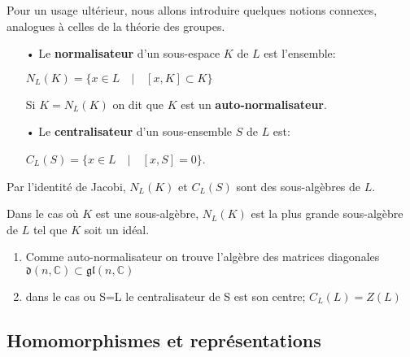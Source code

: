\documentclass[a4paper,openany,12pt]{report}
\newcommand{\CC}{\mathbb{C}}
\newcommand{\gl}{\mathfrak{gl}}
\newcommand{\dd}{\mathfrak{d}}
\theoremstyle{break}
{\theorembodyfont{\upshape}
\newtheorem*{rmq}{Remarque :}
\newtheorem*{prv}{Preuve :}
\newtheorem*{ex}{Exemples :}
\newtheorem*{exe}{Exemple : }
\newtheorem*{nota}{Notation :}
\newtheorem*{dem}{D\'emonstration :}}
\begin{document}
Pour un usage ultérieur, nous allons introduire quelques notions connexes, analogues à celles de la théorie des groupes.

\begin{df}
\begin{itemize}

\item[•] Le \textbf{normalisateur} d'un sous-espace $K$ de $L$ est l'ensemble:  
 \begin{center}
$ N_{L}(K)=\{x \in L \quad |\quad [x,K] \subset K \} $ 
 \end{center}
Si $K = N_{L}(K)$ on dit que $K$ est un \textbf{auto-normalisateur}.

\item[•] Le \textbf{centralisateur} d'un sous-ensemble $S$ de $L$ est:
\begin{center}
$C_{L}(S) = \{x \in L\quad  | \quad [x,S]=0\}$.

\end{center} 
\end{itemize}
\end{df}

\begin{rmq} 
\quad Par l’identité de Jacobi, $N_L(K)$ et $C_L(S)$ sont des sous-algèbres de $L$.

Dans le cas où $K$ est une sous-algèbre, $N_{L}(K)$ est la plus grande sous-algèbre de $L$ tel que $K$ soit un idéal.
\end{rmq}

\begin{exe}
\begin{enumerate}
\item Comme auto-normalisateur on trouve l'algèbre des matrices diagonales\\ $ \dd(n,\CC) \subset \gl(n,\CC)$

\item dans le cas ou S=L le centralisateur de S est son centre; $C_L(L)=Z(L)$

\end{enumerate}
\end{exe}

\subsection{Homomorphismes et représentations}
\end{document}
